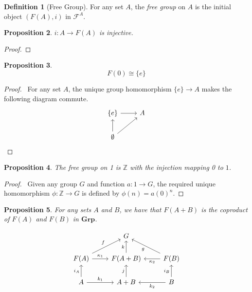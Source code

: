 \documentclass{book}
\let\qed\relax
\newtheorem{prop}{Proposition}[chapter]
\theoremstyle{definition}
\newtheorem{df}[prop]{Definition}
\newcommand{\Grp}{\ensuremath{\mathbf{Grp}}}
\begin{document}
\begin{df}[Free Group]
    For any set $A$, the \emph{free group} on $A$ is the initial object $(F(A),i)$ in $\mathcal{F}^A$.
\end{df}

\begin{prop}
    $i : A \rightarrow F(A)$ is injective.
\end{prop}

\begin{proof}
    \pf
    \qed
\end{proof}

\begin{prop}
    \[ F(0) \cong \{e\} \]
\end{prop}

\begin{proof}
    \pf\ For any set $A$, the unique group homomorphism $\{e\} \rightarrow A$ makes the following diagram commute.
    \[ \begin{tikzcd}
            \{e\} \arrow[r] & A \\
            \emptyset \arrow[u] \arrow[ur]
        \end{tikzcd} \]
\end{proof}

\begin{prop}
    The free group on 1 is $\mathbb{Z}$ with the injection mapping 0 to $1$.
\end{prop}

\begin{proof}
    \pf\ Given any group $G$ and function $a : 1 \rightarrow G$, the required unique homomorphism $\phi : \mathbb{Z} \rightarrow G$ is defined by $\phi(n) = a(0)^n$. \qed
\end{proof}

\begin{prop}
    For any sets $A$ and $B$, we have that $F(A+B)$ is the coproduct of $F(A)$ and $F(B)$ in $\Grp$.
\end{prop}

\[ \begin{tikzcd}
        & G & \\
        F(A) \arrow[r,"\kappa_1"] \arrow[ur,"f"] & F(A+B) \arrow[u,"k"] & \arrow[l,"\kappa_2"] F(B) \arrow[ul,"g"] \\
        A \arrow[r,"k_1"] \arrow[u,"i_A"] & A+B \arrow[u,"j"] & \arrow[l,"k_2"] \arrow[u,"i_B"] B
    \end{tikzcd} \]
\end{document}
